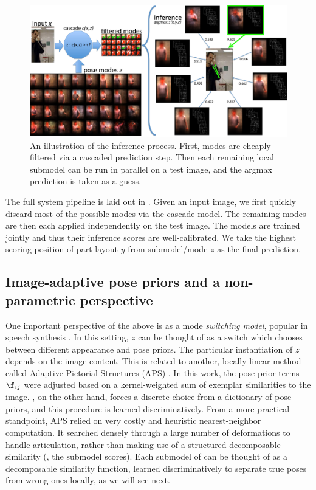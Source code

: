 \begin{figure}[tb!]
\centering
\includegraphics[width=0.99\linewidth]{figs/llps-overview-example.pdf}
\caption[LLPS inference.]{\label{fig:llps-inference} An illustration of the 
inference process. First, modes are cheaply filtered via a cascaded prediction 
step.  Then each remaining local submodel can be run in parallel on a test 
image, and the argmax prediction is taken as a guess. }
\end{figure}
The full system pipeline is laid out in .  Given an 
input image, we first quickly discard most of the possible modes via the 
cascade model.  The remaining  modes are then each applied independently on the 
test image.  The models are trained jointly and thus their inference scores are 
well-calibrated.  We take the highest scoring position of part layout $y$ from 
submodel/mode $z$ as the final prediction.

\subsection{Image-adaptive pose priors and a non-parametric perspective}
One important perspective of the above is as a mode {\em switching model}, 
popular in speech synthesis \citep{rosti2003switching}.  In this setting, $z$ 
can be thought of as a switch which chooses between different appearance and 
pose priors.  The particular instantiation of $z$ depends on the image content.  
This is related to another, locally-linear method called Adaptive Pictorial 
Structures (APS) \citep{sapp2010}.  In this work, the pose prior terms 
$\f_{ij}$ were adjusted based on a kernel-weighted sum of exemplar similarities 
to the image.  \LLPS, on the other hand, forces a discrete choice from a 
dictionary of pose priors, and this procedure is learned discriminatively.  
From a more practical standpoint, APS relied on very costly and heuristic 
nearest-neighbor computation.  It searched densely through a large number of 
deformations to handle articulation, rather than making use of a structured 
decomposable similarity (\ie, the \LLPS submodel scores).  Each submodel of 
\LLPS can be thought of as a decomposable similarity function, learned 
discriminatively to separate true poses from wrong ones locally, as we will see 
next.

